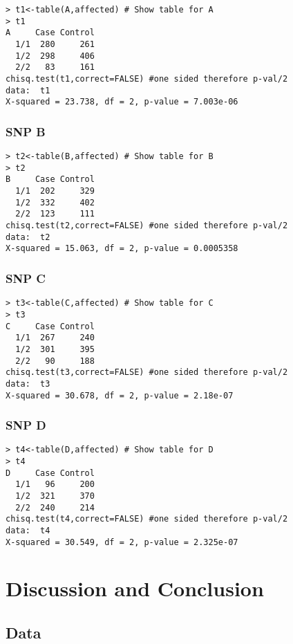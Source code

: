 \documentclass[11 pt,letterpaper]{article}
\begin{document}
        \begin{lstlisting}
> t1<-table(A,affected) # Show table for A
> t1
A     Case Control
  1/1  280     261
  1/2  298     406
  2/2   83     161
chisq.test(t1,correct=FALSE) #one sided therefore p-val/2
data:  t1
X-squared = 23.738, df = 2, p-value = 7.003e-06
        \end{lstlisting}

        \subsubsection{SNP B}
        \begin{lstlisting}
> t2<-table(B,affected) # Show table for B
> t2
B     Case Control
  1/1  202     329
  1/2  332     402
  2/2  123     111
chisq.test(t2,correct=FALSE) #one sided therefore p-val/2
data:  t2
X-squared = 15.063, df = 2, p-value = 0.0005358
        \end{lstlisting}

        \subsubsection{SNP C}

        \begin{lstlisting}
> t3<-table(C,affected) # Show table for C
> t3
C     Case Control
  1/1  267     240
  1/2  301     395
  2/2   90     188
chisq.test(t3,correct=FALSE) #one sided therefore p-val/2
data:  t3
X-squared = 30.678, df = 2, p-value = 2.18e-07
        \end{lstlisting}

        \subsubsection{SNP D}

        \begin{lstlisting}
> t4<-table(D,affected) # Show table for D
> t4
D     Case Control
  1/1   96     200
  1/2  321     370
  2/2  240     214
chisq.test(t4,correct=FALSE) #one sided therefore p-val/2
data:  t4
X-squared = 30.549, df = 2, p-value = 2.325e-07
        \end{lstlisting}

\section{Discussion and Conclusion}

    \subsection{Data}
    
\end{document}
